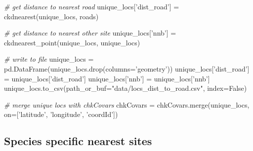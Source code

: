 \documentclass[]{article}
\newenvironment{Shaded}{}{}
\newcommand{\CommentTok}[1]{\textcolor[rgb]{0.38,0.63,0.69}{\textit{#1}}}
\newcommand{\KeywordTok}[1]{\textcolor[rgb]{0.00,0.44,0.13}{\textbf{#1}}}
\newcommand{\NormalTok}[1]{#1}
\newcommand{\OperatorTok}[1]{\textcolor[rgb]{0.40,0.40,0.40}{#1}}
\newcommand{\StringTok}[1]{\textcolor[rgb]{0.25,0.44,0.63}{#1}}
\newcommand{\VariableTok}[1]{\textcolor[rgb]{0.10,0.09,0.49}{#1}}
\begin{document}
\begin{Shaded}
\begin{Highlighting}[]
\CommentTok{# get distance to nearest road}
\NormalTok{unique_locs[}\StringTok{'dist_road'}\NormalTok{] }\OperatorTok{=}\NormalTok{ ckdnearest(unique_locs, roads)}

\CommentTok{# get distance to nearest other site}
\NormalTok{unique_locs[}\StringTok{'nnb'}\NormalTok{] }\OperatorTok{=}\NormalTok{ ckdnearest_point(unique_locs, unique_locs)}

\CommentTok{# write to file}
\NormalTok{unique_locs }\OperatorTok{=}\NormalTok{ pd.DataFrame(unique_locs.drop(columns}\OperatorTok{=}\StringTok{'geometry'}\NormalTok{))}
\NormalTok{unique_locs[}\StringTok{'dist_road'}\NormalTok{] }\OperatorTok{=}\NormalTok{ unique_locs[}\StringTok{'dist_road'}\NormalTok{]}
\NormalTok{unique_locs[}\StringTok{'nnb'}\NormalTok{] }\OperatorTok{=}\NormalTok{ unique_locs[}\StringTok{'nnb'}\NormalTok{]}
\NormalTok{unique_locs.to_csv(path_or_buf}\OperatorTok{=}\StringTok{"data/locs_dist_to_road.csv"}\NormalTok{, index}\OperatorTok{=}\VariableTok{False}\NormalTok{)}

\CommentTok{# merge unique locs with chkCovars}
\NormalTok{chkCovars }\OperatorTok{=}\NormalTok{ chkCovars.merge(unique_locs, on}\OperatorTok{=}\NormalTok{[}\StringTok{'latitude'}\NormalTok{, }
                                             \StringTok{'longitude'}\NormalTok{, }\StringTok{'coordId'}\NormalTok{])}
\end{Highlighting}
\end{Shaded}

\hypertarget{species-specific-nearest-sites}{%
\subsection{Species specific nearest sites}\label{species-specific-nearest-sites}}

\begin{Shaded}
\end{Shaded}
\end{document}
